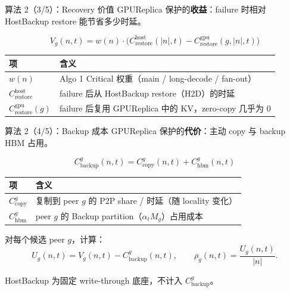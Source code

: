 \documentclass[aspectratio=43]{beamer}
\begin{document}
\begin{frame}{算法 2（3/5）：Recovery 价值}
  \small
  GPUReplica 保护的\textbf{收益}：failure 时相对 HostBackup restore 能节省多少时延。

  \vspace{0.08cm}
  \[
    V_g(n,t)
    =
    w(n)
    \cdot
    \bigl(
      C_{\mathrm{restore}}^{\mathrm{host}}(|n|, t)
      -
      C_{\mathrm{restore}}^{\mathrm{gpu}}(g, |n|, t)
    \bigr)
  \]

  \vspace{0.06cm}
  \scriptsize
  \renewcommand{\arraystretch}{1.12}
  \begin{tabular}{p{}p{}}
    \toprule
    项 & 含义 \\
    \midrule
    $w(n)$ & Algo 1 Critical 权重（main / long-decode / fan-out） \\
    $C_{\mathrm{restore}}^{\mathrm{host}}$ & failure 后从 HostBackup restore（H2D）的时延 \\
    $C_{\mathrm{restore}}^{\mathrm{gpu}}(g)$ & failure 后复用 GPUReplica 中的 KV，zero-copy 几乎为 0 \\
    \bottomrule
  \end{tabular}

  \vspace{0.08cm}
  \footnotesize
\end{frame}

\begin{frame}{算法 2（4/5）：Backup 成本}
  \small
  GPUReplica 保护的\textbf{代价}：主动 copy 与 backup HBM 占用。

  \vspace{0.08cm}
  \[
    C_{\mathrm{backup}}^g(n,t)
    =
    C_{\mathrm{copy}}^g(n,t)
    +
    C_{\mathrm{hbm}}^g(n,t)
  \]

  \vspace{0.06cm}
  \scriptsize
  \renewcommand{\arraystretch}{1.12}
  \begin{tabular}{p{}p{}}
    \toprule
    项 & 含义 \\
    \midrule
    $C_{\mathrm{copy}}^g$ & 复制到 peer $g$ 的 P2P share / 时延（随 locality 变化） \\
    $C_{\mathrm{hbm}}^g$ & peer $g$ 的 Backup partition（$\alpha_t M_g$）占用成本 \\
    \bottomrule
  \end{tabular}

  \vspace{0.10cm}
  对每个候选 peer $g$，计算：
  \[
    U_g(n,t) = V_g(n,t) - C_{\mathrm{backup}}^g(n,t),
    \qquad
    \rho_g(n,t) = \frac{U_g(n,t)}{|n|}.
  \]

  \vspace{0.04cm}
  \footnotesize
  HostBackup 为固定 write-through 底座，不计入 $C_{\mathrm{backup}}^g$。
\end{frame}
\end{document}
